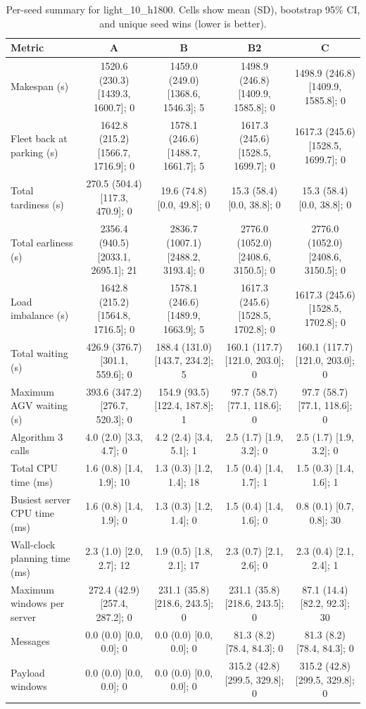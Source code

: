 \begin{table}[t]
\centering
\caption{Per-seed summary for light\_10\_h1800. Cells show mean (SD), bootstrap 95\% CI, and unique seed wins (lower is better).}
\label{tab:light-10-h1800}
\begin{tabular}{lcccc}
\toprule
Metric & A & B & B2 & C \\
\midrule
Makespan (s) & 1520.6 (230.3) [1439.3, 1600.7]; 0 & 1459.0 (249.0) [1368.6, 1546.3]; 5 & 1498.9 (246.8) [1409.9, 1585.8]; 0 & 1498.9 (246.8) [1409.9, 1585.8]; 0 \\
Fleet back at parking (s) & 1642.8 (215.2) [1566.7, 1716.9]; 0 & 1578.1 (246.6) [1488.7, 1661.7]; 5 & 1617.3 (245.6) [1528.5, 1699.7]; 0 & 1617.3 (245.6) [1528.5, 1699.7]; 0 \\
Total tardiness (s) & 270.5 (504.4) [117.3, 470.9]; 0 & 19.6 (74.8) [0.0, 49.8]; 0 & 15.3 (58.4) [0.0, 38.8]; 0 & 15.3 (58.4) [0.0, 38.8]; 0 \\
Total earliness (s) & 2356.4 (940.5) [2033.1, 2695.1]; 21 & 2836.7 (1007.1) [2488.2, 3193.4]; 0 & 2776.0 (1052.0) [2408.6, 3150.5]; 0 & 2776.0 (1052.0) [2408.6, 3150.5]; 0 \\
Load imbalance (s) & 1642.8 (215.2) [1564.8, 1716.5]; 0 & 1578.1 (246.6) [1489.9, 1663.9]; 5 & 1617.3 (245.6) [1528.5, 1702.8]; 0 & 1617.3 (245.6) [1528.5, 1702.8]; 0 \\
Total waiting (s) & 426.9 (376.7) [301.1, 559.6]; 0 & 188.4 (131.0) [143.7, 234.2]; 5 & 160.1 (117.7) [121.0, 203.0]; 0 & 160.1 (117.7) [121.0, 203.0]; 0 \\
Maximum AGV waiting (s) & 393.6 (347.2) [276.7, 520.3]; 0 & 154.9 (93.5) [122.4, 187.8]; 1 & 97.7 (58.7) [77.1, 118.6]; 0 & 97.7 (58.7) [77.1, 118.6]; 0 \\
Algorithm 3 calls & 4.0 (2.0) [3.3, 4.7]; 0 & 4.2 (2.4) [3.4, 5.1]; 1 & 2.5 (1.7) [1.9, 3.2]; 0 & 2.5 (1.7) [1.9, 3.2]; 0 \\
Total CPU time (ms) & 1.6 (0.8) [1.4, 1.9]; 10 & 1.3 (0.3) [1.2, 1.4]; 18 & 1.5 (0.4) [1.4, 1.7]; 1 & 1.5 (0.3) [1.4, 1.6]; 1 \\
Busiest server CPU time (ms) & 1.6 (0.8) [1.4, 1.9]; 0 & 1.3 (0.3) [1.2, 1.4]; 0 & 1.5 (0.4) [1.4, 1.6]; 0 & 0.8 (0.1) [0.7, 0.8]; 30 \\
Wall-clock planning time (ms) & 2.3 (1.0) [2.0, 2.7]; 12 & 1.9 (0.5) [1.8, 2.1]; 17 & 2.3 (0.7) [2.1, 2.6]; 0 & 2.3 (0.4) [2.1, 2.4]; 1 \\
Maximum windows per server & 272.4 (42.9) [257.4, 287.2]; 0 & 231.1 (35.8) [218.6, 243.5]; 0 & 231.1 (35.8) [218.6, 243.5]; 0 & 87.1 (14.4) [82.2, 92.3]; 30 \\
Messages & 0.0 (0.0) [0.0, 0.0]; 0 & 0.0 (0.0) [0.0, 0.0]; 0 & 81.3 (8.2) [78.4, 84.3]; 0 & 81.3 (8.2) [78.4, 84.3]; 0 \\
Payload windows & 0.0 (0.0) [0.0, 0.0]; 0 & 0.0 (0.0) [0.0, 0.0]; 0 & 315.2 (42.8) [299.5, 329.8]; 0 & 315.2 (42.8) [299.5, 329.8]; 0 \\
\bottomrule
\end{tabular}
\end{table}

